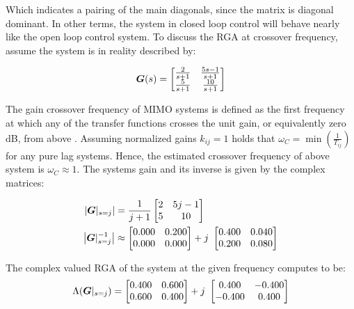 Which indicates a pairing of the main diagonals, since the matrix is diagonal dominant. In other terms, the system in closed loop control will behave nearly like the open loop control system. To discuss the RGA at crossover frequency, assume the system is in reality described by:

\begin{align}
\mbox{\boldmath$G$}(s) = \begin{bmatrix}
\frac{2}{s +1} & \frac{5s-1}{s +1} \\
\frac{5}{s +1} & \frac{10}{s +1}
\end{bmatrix}
\end{align}

The gain crossover frequency of MIMO systems is defined as the first frequency at which any of the transfer functions crosses the unit gain, or equivalently zero dB, from above \cite[p.37]{Skogestad2005}. Assuming normalized gains $k_{ij}= 1$ holds that $\omega_C = \min(\frac{1}{T_{ij}})$for any pure lag systems. Hence, the estimated crossover frequency of above system is $\omega_C \approx 1$. The systems gain and its inverse is given by the complex matrices:

\begin{align}
\begin{split}
\left|\mbox{\boldmath$G$}|_{s=j}\right| &= \frac{1}{j+1} \begin{bmatrix}
2 & 5j-1 \\
5 & 10
\end{bmatrix} \\
\left| \mbox{\boldmath$G$}|_{s=j}^{-1} \right| &\approx \begin{bmatrix}
0.000 & 0.200 \\
0.000 & 0.000
\end{bmatrix} + j~\begin{bmatrix}
0.400 & 0.040 \\
0.200 & 0.080 
\end{bmatrix}
\end{split}
\end{align}

The complex valued RGA of the system at the given frequency computes to be:\\

\begin{align}
\Lambda(\mbox{\boldmath$G$}|_{s=j}) = \begin{bmatrix}
0.400 & 0.600 \\
0.600 & 0.400 
\end{bmatrix}
+ j~\begin{bmatrix}
0.400 & -0.400 \\
-0.400 & 0.400
\end{bmatrix}
\end{align}

